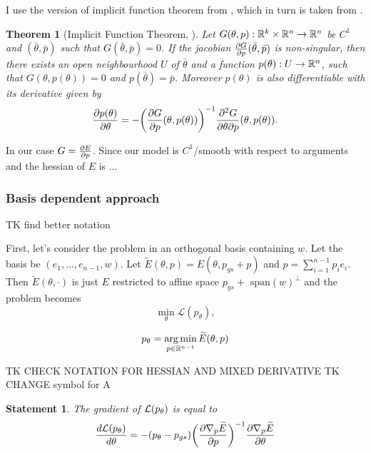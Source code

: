 \documentclass[a4paper,10pt]{report}
\newtheorem{theorem}{Theorem}
\newtheorem{statement}{Statement}
\begin{document}
I use the version of implicit function theorem from \cite{zucchet2022beyond}, which in turn is taken from \cite{dontchev2009implicit}.
\begin{theorem}[Implicit Function Theorem, \cite{zucchet2022beyond} ]
Let $G(\theta, p): \mathbb{R}^k \times \mathbb{R}^n \to \mathbb{R}^n$ be $C^1$ and $(\bar{\theta}, \bar{p})$ such that $G(\bar{\theta},\bar{p})=0$. If the jacobian
$\frac{\partial G}{\partial p}(\bar{\theta},\bar{p})$ is non-singular, then there exists an open neighbourhood $U$ of $\bar{\theta} $ and a function $p(\theta):U \to \mathbb{R}^n$, such that $G(\theta, p(\theta)) = 0$ and $p(\bar{\theta}) = \bar{p}$. Moreover $p(\theta)$ is also differentiable with
its derivative given by
\begin{equation}
\frac{\partial p(\theta)}{\partial \theta}= - \bigg(\frac{\partial G}{\partial p}(\theta, p(\theta))\bigg)^{-1} \frac{\partial^2 G}{\partial \theta \partial p}(\theta, p(\theta)).
\end{equation}

\end{theorem}
In our case $G = \frac{\partial E}{\partial p}$. Since our model is $C^1$/smooth with respect to  arguments and the hessian of $E$ is ...

\subsubsection{Basis dependent approach}
TK find better notation

First, let's consider the problem in an orthogonal basis containing $w$.
Let the basis be $(e_1,\ldots, e_{n-1}, w)$.
Let $\widetilde{E}(\theta, p) = E(\theta, p_{gs}+ p)$ and $p = \sum_{i=1}^{n-1} p_i e_i$.
Then $\widetilde E(\theta, \cdot)$ is just $E$ restricted to affine space $p_{gs}+\text{ span} (w)^\perp$
and the problem becomes
\begin{equation}
  \min_\theta \mathcal{L}(p_\theta),
\end{equation}


\begin{equation}
 p_\theta = \operatorname*{arg\,min}_{p\in \mathbb{R}^{n-1}} \widetilde{E}(\theta, p)
\end{equation}


TK CHECK NOTATION FOR HESSIAN AND MIXED DERIVATIVE
TK CHANGE symbol for A
\begin{statement}
The gradient of $\mathcal{L}(p_\theta)$ is equal to
 \begin{equation}
 \frac{d\mathcal{L}(p_\theta)}{d \theta} = -(p_\theta - p_{gs}) \bigg(\frac{\partial \nabla_p \widetilde{E}}{\partial p}\bigg)^{-1}  \frac{\partial  \nabla_p \widetilde{E}}{\partial \theta}
\end{equation}
\end{statement}
\end{document}
